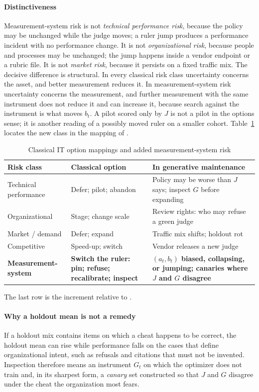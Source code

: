 \documentclass[acmsmall,screen,review,anonymous]{acmart}
\theoremstyle{acmdefinition}
\begin{document}
\paragraph{Distinctiveness} Measurement-system risk is not \emph{technical performance risk}, because the policy may be unchanged while the judge moves; a ruler jump produces a performance incident with no performance change. It is not \emph{organizational risk}, because people and processes may be unchanged; the jump happens inside a vendor endpoint or a rubric file. It is not \emph{market risk}, because it persists on a fixed traffic mix. The decisive difference is structural. In every classical risk class uncertainty concerns the asset, and better measurement reduces it. In measurement-system risk uncertainty concerns the measurement, and further measurement with the same instrument does not reduce it and can increase it, because search against the instrument is what moves $b_t$. A pilot scored only by $J$ is not a pilot in the options sense; it is another reading of a possibly moved ruler on a smaller cohort. Table~\ref{tab:mapping} locates the new class in the mapping of \citet{benaroch2006}.

\begin{table}[t]
\caption{Classical IT option mappings and added measurement-system risk}\label{tab:mapping}
\small
\begin{tabular}{@{}p{3.2cm}p{4.0cm}p{5.6cm}@{}}
\toprule
Risk class & Classical option & In generative maintenance \\
\midrule
Technical performance & Defer; pilot; abandon & Policy may be worse than $J$ says; inspect $G$ before expanding \\
Organizational & Stage; change scale & Review rights: who may refuse a green judge \\
Market / demand & Defer; expand & Traffic mix shifts; holdout rot \\
Competitive & Speed-up; switch & Vendor releases a new judge \\
\textbf{Measurement-system} & \textbf{Switch the ruler: pin; refuse; recalibrate; inspect} & \textbf{$(a_t,b_t)$ biased, collapsing, or jumping; canaries where $J$ and $G$ disagree} \\
\bottomrule
\end{tabular}
\par\smallskip\footnotesize The last row is the increment relative to \citet{benaroch2006}.
\end{table}

\paragraph{Why a holdout mean is not a remedy} If a holdout mix contains items on which a cheat happens to be correct, the holdout mean can rise while performance falls on the cases that define organizational intent, such as refusals and citations that must not be invented. Inspection therefore means an instrument $G_t$ on which the optimizer does not train and, in its sharpest form, a \emph{canary} set constructed so that $J$ and $G$ disagree under the cheat the organization most fears.
\end{document}
